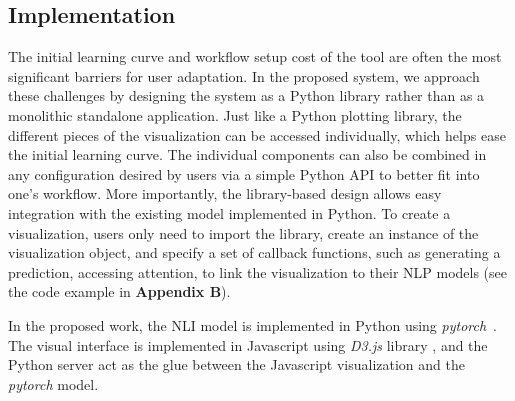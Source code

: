 \subsection{Implementation}
\label{sec:implementation}
The initial learning curve and workflow setup cost of the tool are often the most significant barriers for user adaptation.
In the proposed system, we approach these challenges by designing the system as a Python library rather than as a monolithic standalone application. 
Just like a Python plotting library, the different pieces of the visualization can be accessed individually, which helps ease the initial learning curve. 
The individual components can also be combined in any configuration desired by users via a simple Python API to better fit into one's workflow.
More importantly, the library-based design allows easy integration with the existing model implemented in Python.
%
To create a visualization, users only need to import the library, create an instance of the visualization object, and specify a set of callback functions, such as generating a prediction, accessing attention, to link the visualization to their NLP models (see the code example in \textbf{Appendix B}). 


%
In the proposed work, the NLI model is implemented in Python using \emph{pytorch}~\cite{PaszkeGrossChintala2017}.
The visual interface is implemented in Javascript using \emph{D3.js} library , and the Python server act as the glue between the Javascript visualization and the \emph{pytorch} model.

